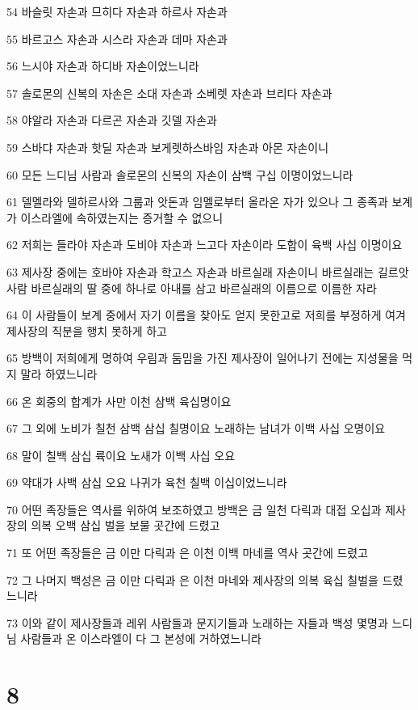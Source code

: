 \par 54 바슬릿 자손과 므히다 자손과 하르사 자손과
\par 55 바르고스 자손과 시스라 자손과 데마 자손과
\par 56 느시야 자손과 하디바 자손이었느니라
\par 57 솔로몬의 신복의 자손은 소대 자손과 소베렛 자손과 브리다 자손과
\par 58 야알라 자손과 다르곤 자손과 깃델 자손과
\par 59 스바댜 자손과 핫딜 자손과 보게렛하스바임 자손과 아몬 자손이니
\par 60 모든 느디님 사람과 솔로몬의 신복의 자손이 삼백 구십 이명이었느니라
\par 61 델멜라와 델하르사와 그룹과 앗돈과 임멜로부터 올라온 자가 있으나 그 종족과 보계가 이스라엘에 속하였는지는 증거할 수 없으니
\par 62 저희는 들라야 자손과 도비야 자손과 느고다 자손이라 도합이 육백 사십 이명이요
\par 63 제사장 중에는 호바야 자손과 학고스 자손과 바르실래 자손이니 바르실래는 길르앗 사람 바르실래의 딸 중에 하나로 아내를 삼고 바르실래의 이름으로 이름한 자라
\par 64 이 사람들이 보계 중에서 자기 이름을 찾아도 얻지 못한고로 저희를 부정하게 여겨 제사장의 직분을 행치 못하게 하고
\par 65 방백이 저희에게 명하여 우림과 둠밈을 가진 제사장이 일어나기 전에는 지성물을 먹지 말라 하였느니라
\par 66 온 회중의 합계가 사만 이천 삼백 육십명이요
\par 67 그 외에 노비가 칠천 삼백 삼십 칠명이요 노래하는 남녀가 이백 사십 오명이요
\par 68 말이 칠백 삼십 륙이요 노새가 이백 사십 오요
\par 69 약대가 사백 삼십 오요 나귀가 육천 칠백 이십이었느니라
\par 70 어떤 족장들은 역사를 위하여 보조하였고 방백은 금 일천 다릭과 대접 오십과 제사장의 의복 오백 삼십 벌을 보물 곳간에 드렸고
\par 71 또 어떤 족장들은 금 이만 다릭과 은 이천 이백 마네를 역사 곳간에 드렸고
\par 72 그 나머지 백성은 금 이만 다릭과 은 이천 마네와 제사장의 의복 육십 칠벌을 드렸느니라
\par 73 이와 같이 제사장들과 레위 사람들과 문지기들과 노래하는 자들과 백성 몇명과 느디님 사람들과 온 이스라엘이 다 그 본성에 거하였느니라

\chapter{8}

